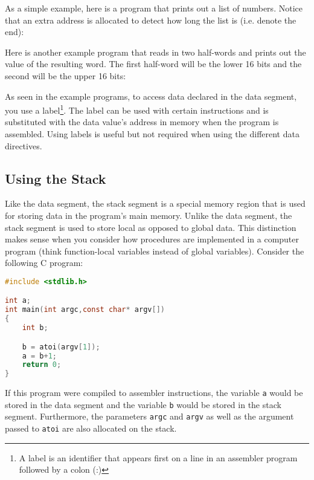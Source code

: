 \documentclass[12pt]{article}
\begin{document}
As a simple example, here is a program that prints out a list of numbers. Notice
     that an extra address is allocated to detect how long the list is
     (i.e. denote the end):



Here is another example program that reads in two half-words and prints out the
     value of the resulting word. The first half-word will be the lower 16 bits
     and the second will be the upper 16 bits:



As seen in the example programs, to access data declared in the data segment,
     you use a label\footnote{A label is an identifier that appears first on a
     line in an assembler program followed by a colon (:)}. The label can be
     used with certain instructions and is substituted with the data value's
     address in memory when the program is assembled. Using labels is useful but
     not required when using the different data directives.\\

\subsection{Using the Stack}

Like the data segment, the stack segment is a special memory region that is used
     for storing data in the program's main memory. Unlike the data segment, the
     stack segment is used to store local as opposed to global data. This
     distinction makes sense when you consider how procedures are implemented in
     a computer program (think function-local variables instead of global
     variables). Consider the following C program:\\

\begin{lstlisting}[language=C]
#include <stdlib.h>

int a;
int main(int argc,const char* argv[])
{
    int b;

    b = atoi(argv[1]);
    a = b+1;
    return 0;
}
\end{lstlisting}

If this program were compiled to assembler instructions, the variable \texttt{a}
     would be stored in the data segment and the variable \texttt{b} would be
     stored in the stack segment. Furthermore, the parameters \texttt{argc} and
     \texttt{argv} as well as the argument passed to \texttt{atoi} are also
     allocated on the stack.\\
\end{document}
